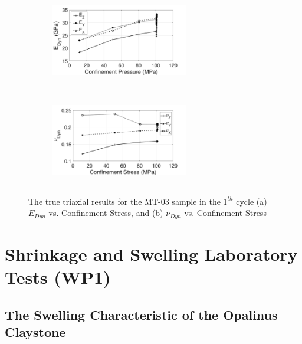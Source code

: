 \begin{figure}[ht!]
\centering
\begin{subfigure}[c]{0.48\textwidth}
\centering
\includegraphics[width=6cm,height=4cm]{figures/Amir_TrueTriaxial_MT_03_Result_E.png}
\subcaption{}
\end{subfigure}
\hfill
\begin{subfigure}[c]{0.48\textwidth}
\centering
\includegraphics[width=6cm,height=4cm]{figures/Amir_TrueTriaxial_MT_03_Result_Nu.png}
\subcaption{}
\end{subfigure}
\caption{The true triaxial results for the MT-03 sample in the $1^{th}$ cycle (a) $E_{Dyn}$ vs. Confinement Stress, and (b) $\nu_{Dyn}$ vs. Confinement Stress}
\label{fig:Amir_TrueTriaxial_MT_03_Result}
\end{figure}


\section{Shrinkage and Swelling Laboratory Tests (WP1)}

\subsection{The Swelling Characteristic of the Opalinus Claystone}


